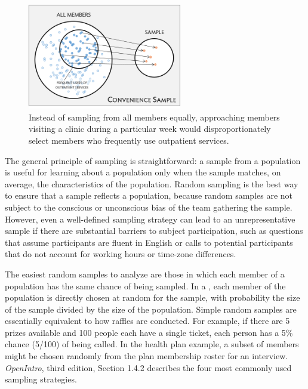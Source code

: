 \begin{figure}[h!]
	\centering
	\includegraphics[width=0.60\textwidth]{ch_intro_to_data_oi_biostat/figures/sampleHealthPlan/sampleConvenienceHealthPlan.png}
	\caption{Instead of sampling from all members equally, approaching members visiting a clinic during a particular week would disproportionately select members who frequently use outpatient services.}
	\label{sampleConvenienceHealthPlan}
\end{figure}


The general principle of sampling is straightforward: a sample from a population is useful for learning about a population only when the sample matches, on average, the characteristics of the population. Random sampling is the best way to ensure that a sample reflects a population, because random samples are not subject to the conscious or unconscious bias of the team gathering the sample.  However, even a well-defined sampling strategy can lead to an unrepresentative sample if there are substantial barriers to subject participation, such as questions that assume participants are fluent in English or calls to potential participants that do not account for working hours or time-zone differences. 

The easiest random samples to analyze are those in which each member of a population has the same chance of being sampled. In a , each member of the population is directly chosen at random for the sample, with probability the size of the sample divided by the size of the population. Simple random samples are essentially equivalent to how raffles are conducted. For example, if there are 5 prizes available and 100 people each have a single ticket, each person has a 5\% chance (5/100) of being called. In the health plan example, a subset of members might be chosen randomly from the plan membership roster for an interview. \textsl{OpenIntro}, third edition, Section 1.4.2 describes the four most commonly used sampling strategies. 

